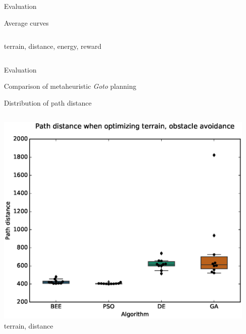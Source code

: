 \documentclass[9pt]{beamer}
\begin{document}
\begin{frame}{Evaluation}
\begin{block}{Average curves}
\begin{columns}
\begin{column}{0.5\textwidth}
\begin{center}
                    \linebreak
                    terrain, distance, energy, reward
                \end{center}
            \end{column}
        \end{columns}
    \end{block}
\end{frame}


\begin{frame}{Evaluation}
    \begin{block}{Comparison of metaheuristic \textit{Goto} planning}
    \end{block}
    \begin{block}{Distribution of path distance}
        \begin{columns}
            \begin{column}{0.5\textwidth}
                \begin{center}
                    \includegraphics[width=\textwidth,trim={.75cm .75cm 0cm 1cm},clip]{img/EXP3_histo_distance_a.eps}
                    \linebreak
                    terrain, distance
                \end{center}
            \end{column}
            \begin{column}{0.5\textwidth}
                \begin{center}

\end{center}
\end{column}
\end{columns}
\end{block}
\end{frame}
\end{document}
